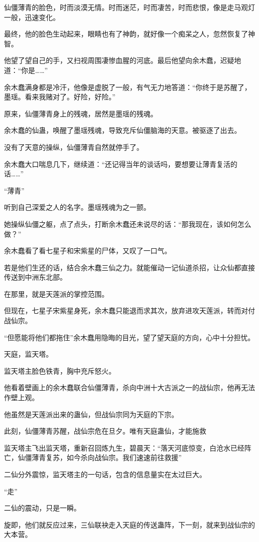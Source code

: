 \begin{this_body}
仙僵薄青的脸色，时而淡漠无情。时而迷茫，时而凄苦，时而悲恨，像是走马观灯一般，迅速变化。

最终，他的脸色生动起来，眼睛也有了神韵，就好像一个痴呆之人，忽然恢复了神智。

他望了望自己的手，又扫视周围凄惨血腥的河底。最后他望向余木蠢，迟疑地道：“你是……”

余木蠢满身都是冷汗，他像是虚脱了一般，有气无力地答道：“你终于是苏醒了，墨瑶。看来我赌对了。好险，好险。”

原来，仙僵薄青身上的残魂，居然是墨瑶的残魂。

余木蠢的仙蛊，唤醒了墨瑶残魂，导致充斥仙僵脑海的天意。被驱逐了出去。

没有了天意的操纵，仙僵薄青自然就停手了。

余木蠢大口喘息几下，继续道：“还记得当年的谈话吗，要想要让薄青复活的话……”

“薄青”

听到自己深爱之人的名字。墨瑶残魂为之一颤。

她操纵仙僵之躯，点了点头，打断余木蠢还未说尽的话：“那我现在，该如何怎么做？”

余木蠢看了看七星子和宋紫星的尸体，又叹了一口气。

若是他们生还的话，结合余木蠢三仙之力。就能催动一记仙道杀招，让众仙都直接传送到中洲东北部。

在那里，就是天莲派的掌控范围。

但现在，七星子宋紫星身死，余木蠢只能退而求其次，放弃进攻天莲派，转而对付战仙宗。

“但愿能将他们都拖住”余木蠢用隐晦的目光，望了望天庭的方向，心中十分担忧。

天庭，监天塔。

监天塔主脸色铁青，胸中充斥怒火。

他看着壁画上的余木蠢联合仙僵薄青，杀向中洲十大古派之一的战仙宗，他再无法作壁上观。

他虽然是天莲派出来的蛊仙，但战仙宗同为天庭的下宗。

此刻，仙僵薄青苏醒，战仙宗危在旦夕。唯有天庭蛊仙，才能施救

监天塔主飞出监天塔，重新召回炼九生，碧晨天：“落天河底惊变，白沧水已经阵亡，仙僵薄青复苏，如今杀向战仙宗。我们速速前往救援”

二仙分外震惊，监天塔主的一句话，包含的信息量实在太过巨大。

“走”

二仙的震动，只是一瞬。

旋即，他们就反应过来，三仙联袂走入天庭的传送蛊阵，下一刻，就来到战仙宗的大本营。


\end{this_body}
